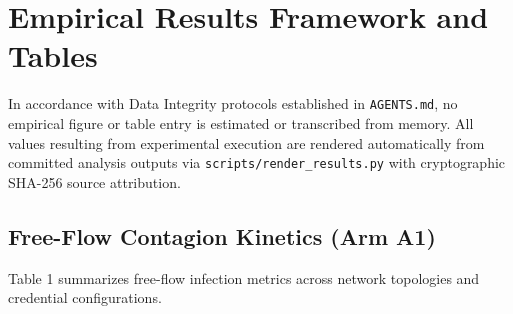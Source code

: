 \documentclass[11pt,a4paper]{article}
\begin{document}
\section{Empirical Results Framework and Tables}

In accordance with Data Integrity protocols established in \texttt{AGENTS.md}, no empirical figure or table entry is estimated or transcribed from memory. All values resulting from experimental execution are rendered automatically from committed analysis outputs via \texttt{scripts/render\_results.py} with cryptographic SHA-256 source attribution.

\subsection{Free-Flow Contagion Kinetics (Arm A1)}

Table 1 summarizes free-flow infection metrics across network topologies and credential configurations.
\end{document}
